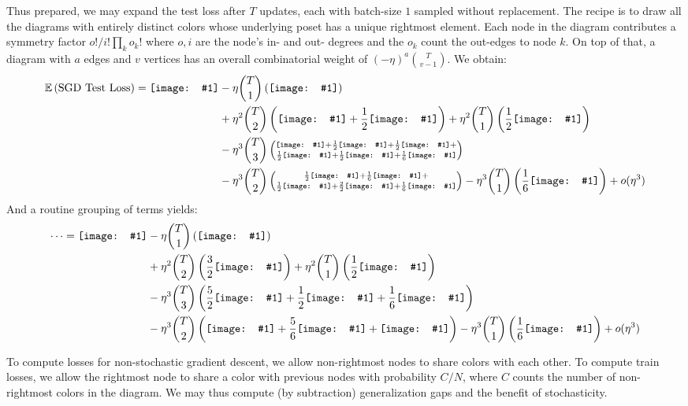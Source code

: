 \documentclass[12pt]{article}
\newcommand{\half}{\frac{1}{2}}
\newcommand{\sixth}{\frac{1}{6}}
\newcommand{\dia}[1]{\texttt{[image: \#1]}}
\begin{document}
            Thus prepared, we may expand the test loss after $T$ updates, each with batch-size $1$ sampled without
            replacement.  The recipe is to draw all the diagrams with entirely distinct colors whose underlying poset
            has a unique rightmost element.
            Each node in the diagram contributes a symmetry factor $o!/i!\prod_k o_k!$ where $o, i$ are the node's
            in- and out- degrees and the $o_k$ count the out-edges to node $k$.  On top of
            that, a diagram with $a$ edges and $v$ vertices has an overall combinatorial weight of
            $(-\eta)^a {T \choose v-1}$.  We obtain:
            \begin{align*}
                \expec \wrap{\text{SGD Test Loss}} = \dia{sgd-0}
                &- \eta   {T \choose 1} \wrap{\dia{sgd-1}} \\
                &+ \eta^2 {T \choose 2} \wrap{\dia{sgd-2a} + \half \dia{sgd-2b}}
                 + \eta^2 {T \choose 1} \wrap{\half \dia{sgd-2c}} \\
                &- \eta^3 {T \choose 3} \wrap{\substack{
                        \dia{sgd-3a} + \half \dia{sgd-3b} + \half \dia{sgd-3c} + \\
                        \half \dia{sgd-3d} + \half \dia{sgd-3e} + \sixth \dia{sgd-3f}
                        }} \\  
                &- \eta^3 {T \choose 2} \wrap{\substack{
                        \half \dia{sgd-3g} + \sixth \dia{sgd-3i} + \\
                        \half \dia{sgd-3h} + \frac{2}{2} \dia{sgd-3k} + \sixth \dia{sgd-3j}
                        }} 
                 - \eta^3 {T \choose 1} \wrap{\sixth \dia{sgd-3l}} 
                 + o(\eta^3)
            \end{align*}
            And a routine grouping of terms yields:
            \begin{align*}
                \cdots = \dia{sgd-0}
                &- \eta   {T \choose 1} \wrap{\dia{sgd-1}} \\
                &+ \eta^2 {T \choose 2} \wrap{\frac{3}{2}\dia{sgd-2a}}
                 + \eta^2 {T \choose 1} \wrap{\half \dia{sgd-2c}} \\
                &- \eta^3 {T \choose 3} \wrap{\frac{5}{2} \dia{sgd-3a} + \half \dia{sgd-3b} + \sixth \dia{sgd-3f}} \\
                &- \eta^3 {T \choose 2} \wrap{\dia{sgd-3g} + \frac{5}{6} \dia{sgd-3h} + \dia{sgd-3k}} 
                 - \eta^3 {T \choose 1} \wrap{\sixth \dia{sgd-3l}} 
                 + o(\eta^3)
            \end{align*}

            To compute losses for non-stochastic gradient descent, we allow non-rightmost nodes to share colors with
            each other.
            To compute train losses, we allow the rightmost node to share a color with previous nodes with probability
            $C/N$, where $C$ counts the number of non-rightmost colors in the diagram. 
            We may thus compute (by subtraction) generalization gaps and the benefit of stochasticity.
\end{document}
